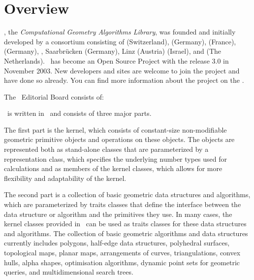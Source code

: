 \section{Overview}

\cgal, the {\em Computational Geometry Algorithms Library}, 
was founded and initially developed by a consortium consisting of
 (Switzerland), 
 (Germany), 
 (France),
 (Germany),
,
Saarbr\"ucken (Germany),
 Linz (Austria)
 (Israel), and
 (The Netherlands). 
\cgal\ has become an Open Source Project with the release 3.0 in
November 2003. New developers and sites are welcome to join the
project and have done so already. 
You can find more information about the project on the 
.

The \cgal\ Editorial Board consists of:




\cgal\ is written in \CC\ and consists of three major parts.

The first part is the kernel, which consists of constant-size non-modifiable 
geometric primitive objects and operations on these objects. 
The objects are represented both as stand-alone classes that are
parameterized by a representation class, which specifies
the underlying number types used for calculations and as members of the
kernel classes, which allows for more flexibility and adaptability of the 
kernel.

The second part is a collection of basic geometric data structures and
algorithms, which are parameterized by traits classes that define the 
interface between the data structure or algorithm and the primitives they use.
In many cases, the kernel classes provided in \cgal\ can be used as traits
classes for these data structures and algorithms.
The collection of basic geometric algorithms and data structures
currently includes polygons, half-edge data structures, polyhedral surfaces, 
topological maps, planar maps, arrangements of curves, triangulations, 
convex hulls, alpha shapes, optimisation algorithms, dynamic
point sets for geometric queries, and multidimensional search trees.

